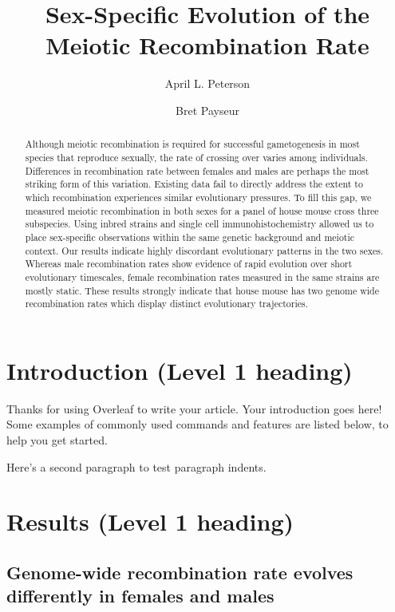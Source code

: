 \documentclass[9pt,lineno]{elife}
\title{Sex-Specific Evolution of the Meiotic Recombination Rate}
\author[1*]{April L. Peterson}
\author[1,2\authfn{1}\authfn{3}]{Bret Payseur}
\affil[1]{University of Wisconsin-Madison}
\begin{document}
\maketitle

\begin{abstract}
Although meiotic recombination is required for successful gametogenesis in most species that reproduce sexually, the rate of crossing over varies among individuals. Differences in recombination rate between females and males are perhaps the most striking form of this variation. Existing data fail to directly address the extent to which recombination experiences similar evolutionary pressures. To fill this gap, we measured meiotic recombination in both sexes for a panel of house mouse cross three subspecies. Using inbred strains and single cell immunohistochemistry allowed us to place sex-specific observations within the same genetic background and meiotic context. Our results indicate highly discordant evolutionary patterns in the two sexes. Whereas male recombination rates show evidence of rapid evolution over short evolutionary timescales, female recombination rates measured in the same strains are mostly static. These results strongly indicate that house mouse has two genome wide recombination rates which display distinct evolutionary trajectories. 
\end{abstract}


\section{Introduction (Level 1 heading)}

Thanks for using Overleaf to write your article. Your introduction goes here! Some examples of commonly used commands and features are listed below, to help you get started.

Here's a second paragraph to test paragraph indents. \lipsum[1]

\section{Results (Level 1 heading)}


\subsection{Genome-wide recombination rate evolves differently in females and males} 
\end{document}
